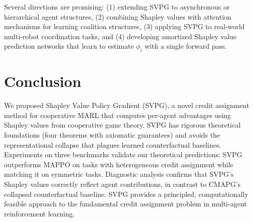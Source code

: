 \documentclass[11pt,a4paper]{article}
\begin{document}
Several directions are promising: (1) extending SVPG to asynchronous or hierarchical agent structures, (2) combining Shapley values with attention mechanisms for learning coalition structures, (3) applying SVPG to real-world multi-robot coordination tasks, and (4) developing amortized Shapley value prediction networks that learn to estimate $\phi_i$ with a single forward pass.

\section{Conclusion}

We proposed Shapley Value Policy Gradient (SVPG), a novel credit assignment method for cooperative MARL that computes per-agent advantages using Shapley values from cooperative game theory. SVPG has rigorous theoretical foundations (four theorems with axiomatic guarantees) and avoids the representational collapse that plagues learned counterfactual baselines. Experiments on three benchmarks validate our theoretical predictions: SVPG outperforms MAPPO on tasks with heterogeneous credit assignment while matching it on symmetric tasks. Diagnostic analysis confirms that SVPG's Shapley values correctly reflect agent contributions, in contrast to CMAPG's collapsed counterfactual baseline. SVPG provides a principled, computationally feasible approach to the fundamental credit assignment problem in multi-agent reinforcement learning.

\end{document}
